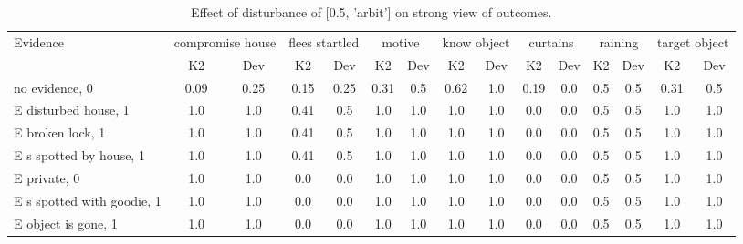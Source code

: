 \begin{table}\begin{tabular}{l|cc|cc|cc|cc|cc|cc|cc}\toprule\multirow{2}{*}{Evidence} & \multicolumn{2}{c}{compromise house}& \multicolumn{2}{c}{flees startled}& \multicolumn{2}{c}{motive}& \multicolumn{2}{c}{know object}& \multicolumn{2}{c}{curtains}& \multicolumn{2}{c}{raining}& \multicolumn{2}{c}{target object}\\& {K2} & {Dev}& {K2} & {Dev}& {K2} & {Dev}& {K2} & {Dev}& {K2} & {Dev}& {K2} & {Dev}& {K2} & {Dev}\\\midrule
no evidence, 0 & \cellcolor{Bittersweet}0.09&\cellcolor{Bittersweet}0.25&\cellcolor{Bittersweet}0.15&\cellcolor{Bittersweet}0.25&\cellcolor{Bittersweet}0.31&\cellcolor{Bittersweet}0.5&\cellcolor{Bittersweet}0.62&\cellcolor{Bittersweet}1.0&\cellcolor{Bittersweet}0.19&\cellcolor{Bittersweet}0.0&0.5&0.5&\cellcolor{Bittersweet}0.31&\cellcolor{Bittersweet}0.5\\E disturbed house, 1 & 1.0&1.0&\cellcolor{Bittersweet}0.41&\cellcolor{Bittersweet}0.5&1.0&1.0&1.0&1.0&0.0&0.0&0.5&0.5&1.0&1.0\\E broken lock, 1 & 1.0&1.0&\cellcolor{Bittersweet}0.41&\cellcolor{Bittersweet}0.5&1.0&1.0&1.0&1.0&0.0&0.0&0.5&0.5&1.0&1.0\\E s spotted by house, 1 & 1.0&1.0&\cellcolor{Bittersweet}0.41&\cellcolor{Bittersweet}0.5&1.0&1.0&1.0&1.0&0.0&0.0&0.5&0.5&1.0&1.0\\E private, 0 & 1.0&1.0&0.0&0.0&1.0&1.0&1.0&1.0&0.0&0.0&0.5&0.5&1.0&1.0\\E s spotted with goodie, 1 & 1.0&1.0&0.0&0.0&1.0&1.0&1.0&1.0&0.0&0.0&0.5&0.5&1.0&1.0\\E object is gone, 1 & 1.0&1.0&0.0&0.0&1.0&1.0&1.0&1.0&0.0&0.0&0.5&0.5&1.0&1.0\\\bottomrule\end{tabular}\caption{Effect of disturbance of [0.5, 'arbit'] on strong view of outcomes.}\end{table}